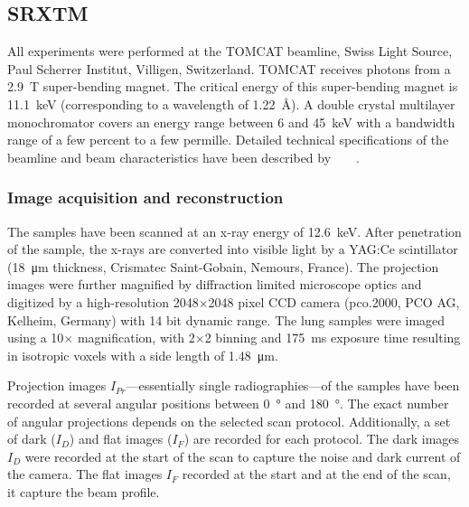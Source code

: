 \subsection{SRXTM}%
All experiments were performed at the TOMCAT beamline, Swiss Light Source, Paul Scherrer Institut, Villigen, Switzerland. %
TOMCAT receives photons from a \SI{2.9}{\tesla} super-bending magnet. The critical energy of this super-bending magnet is \SI{11.1}{\kilo\electronvolt} (corresponding to a wavelength of \SI{1.22}{\angstrom}). A double crystal multilayer monochromator covers an energy range between 6 and \SI{45}{\kilo\electronvolt} with a bandwidth range of a few percent to a few permille. Detailed technical specifications of the beamline and beam characteristics have been described by%
\ifhtml
	~\citet{Stampanoni2006a}
\else
	~
\fi%
.

\subsubsection{Image acquisition and reconstruction}%
\label{seq:Image Acquisition}%
The samples have been scanned at an x-ray energy of \SI{12.6}{\kilo\electronvolt}. After penetration of the sample, the x-rays are converted into visible light by a YAG:Ce scintillator (\SI{18}{\micro\meter} thickness, Crismatec Saint-Gobain, Nemours, France). The projection images were further magnified by diffraction limited microscope optics and digitized by a high-resolution 2048$\times$2048 pixel CCD camera (pco.2000, PCO AG, Kelheim, Germany) with 14 bit dynamic range. %
The lung samples were imaged using a 10$\times$ magnification, with 2$\times$2 binning and \SI{175}{\milli\second} exposure time resulting in isotropic voxels with a side length of \SI{1.48}{\micro\meter}.

Projection images $I_{Pr}$---essentially single radiographies---of the samples have been recorded at several angular positions between \SI{0}{\degree} and \SI{180}{\degree}. The exact number of angular projections depends on the selected scan protocol. Additionally, a set of dark ($I_{D}$) and flat images ($I_{F}$) are recorded for each protocol. The dark images $I_{D}$ were recorded at the start of the scan to capture the noise and dark current of the camera. The flat images $I_{F}$ recorded at the start and at the end of the scan, it capture the beam profile.


